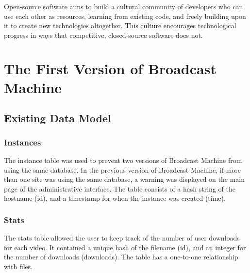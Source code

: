 \documentclass[a4paper,12pt]{report}
\begin{document}
Open-source software aims to build a cultural community of developers who can use each other as resources, learning from existing code, and freely building upon it to create new technologies altogether.
This culture encourages technological progress in ways that competitive, closed-source software does not. 


\section{The First Version of Broadcast Machine}

\subsection{Existing Data Model}


\subsubsection{Instances}
The instance table was used to prevent two versions of Broadcast Machine from using the same database. In the previous version of Broadcast Machine, if more than one site was using the same database, a warning was displayed on the main page of the administrative interface. The table consists of a hash string of the hostname (id), and a timestamp for when the instance was created (time). 


\subsubsection{Stats}
The stats table allowed the user to keep track of the number of user downloads for each video. It contained a unique hash of the filename (id), and an integer for the number of downloads (downloads). The table has a one-to-one relationship with files.
\end{document}
